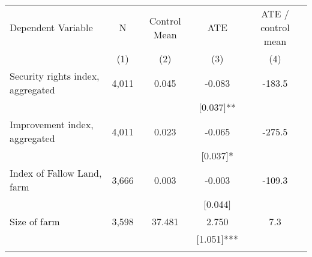 \begin{tabular}{lcccc}
\hline \noalign{\smallskip}Dependent Variable & N & Control Mean & ATE & ATE / control mean\\
 & (1) & (2) & (3) & (4)\\
\noalign{\smallskip}\hline \noalign{\smallskip}Security rights index, aggregated & 4,011 & 0.045 & -0.083 & -183.5\\
 &  &  & [0.037]** & \\
Improvement index, aggregated & 4,011 & 0.023 & -0.065 & -275.5\\
 &  &  & [0.037]* & \\
Index of Fallow Land, farm & 3,666 & 0.003 & -0.003 & -109.3\\
 &  &  & [0.044] & \\
Size of farm & 3,598 & 37.481 & 2.750 & 7.3\\
 &  &  & [1.051]*** & \\
\noalign{\smallskip}\hline\end{tabular}
